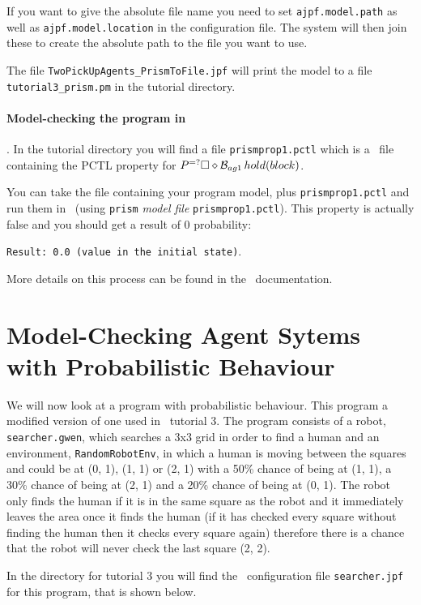 \documentclass[a4]{article}
\begin{document}
If you want to give the absolute file name you need to set \texttt{ajpf.model.path} as well as \texttt{ajpf.model.location} in the configuration file.  The system will then join these to create the absolute path to the file you want to use.

The file \texttt{TwoPickUpAgents\_PrismToFile.jpf} will print the model to a file \texttt{tutorial3\_prism.pm} in the tutorial directory.

\paragraph{Model-checking the program in \prism}.  In the tutorial directory you will find a file \texttt{prismprop1.pctl} which is a \prism\ file containing the PCTL property for $P^{=?}\Box \diamond \mathrm{{\cal B}}_{ag1} \, hold(block)$.  

You can take the file containing  your program model, plus \texttt{prismprop1.pctl} and run them in \prism\ (using \texttt{prism} \emph{model file} \texttt{prismprop1.pctl}).  This property is actually false and you should get a result of 0 probability:

\texttt{Result: 0.0 (value in the initial state)}.

More details on this process can be found in the \spin\ documentation.

\section{Model-Checking Agent Sytems with Probabilistic Behaviour}

We will now look at a program with probabilistic behaviour.  This program a modified version of one used in \ail\ tutorial 3. The program consists of a robot, \texttt{searcher.gwen}, which searches a 3x3 grid in order to find a human and an environment, \texttt{RandomRobotEnv}, in which a human is moving between the squares and could be at (0, 1), (1, 1) or (2, 1) with a 50\% chance of being at (1, 1), a 30\% chance of being at (2, 1) and a 20\% chance of being at (0, 1).  The robot only finds the human if it is in the same square as the robot and it immediately leaves the area once it finds the human (if it has checked every square without finding the human then it checks every square again) therefore there is a chance that the robot will never check the last square (2, 2).

In the directory for tutorial 3 you will find the \ajpf\ configuration file \texttt{searcher.jpf} for this program, that is shown below.
\end{document}
